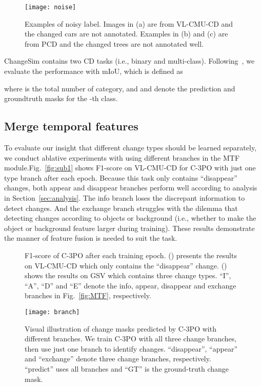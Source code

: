 \documentclass[review]{elsarticle}
\begin{document}
\begin{figure}
	\centering
	\texttt{[image: noise]}
	\caption{Examples of noisy label. Images in (a) are from VL-CMU-CD and the changed cars are not annotated. Examples in (b) and (c) are from PCD and the changed trees are not annotated well.}
	\label{fig:noise}
\end{figure}

ChangeSim contains two CD tasks (i.e., binary and multi-class). Following~\cite{changesim}, we evaluate the performance with mIoU, which is defined as 

where  is the total number of category, and  and  denote the prediction and groundtruth masks for the -th class.

\subsection{Merge temporal features}
\label{sec:merge_t}

To evaluate our insight that different change types should be learned separately, we conduct ablative experiments with using different branches in the MTF module.Fig.~\ref{fig:sub1} shows F1-score on VL-CMU-CD for C-3PO with just one type branch after each epoch. Because this task only contains ``disappear'' changes, both appear and disappear branches perform well according to analysis in Section~\ref{sec:analysis}. The info branch loses the discrepant information to detect changes. And the exchange branch struggles with the dilemma that detecting changes according to objects or background (i.e., whether to make the object or background feature larger during training). These results demonstrate the manner of feature fusion is needed to suit the task.

\begin{figure}
\caption{F1-score of C-3PO after each training epoch. (\protect{}) presents the results on VL-CMU-CD which only contains the ``disappear'' change. (\protect{}) shows the results on GSV which contains three change types. ``I'', ``A'', ``D'' and ``E'' denote the info, appear, disappear and exchange branches in Fig.~\ref{fig:MTF}, respectively.}
\label{fig:CMU_plot} 
\end{figure}

\begin{figure}
	\centering
	\texttt{[image: branch]}
	\caption{Visual illustration of change masks predicted by C-3PO with different branches. We train C-3PO with all three change branches, then use just one branch to identify changes. ``disappear'', ``appear'' and ``exchange'' denote three change branches, respectively. ``predict'' uses all branches and ``GT'' is the ground-truth change mask.}
	\label{fig:branch}
\end{figure}
\end{document}
